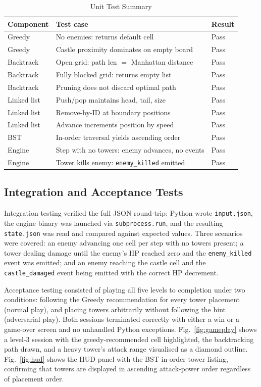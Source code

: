 \documentclass[conference]{IEEEtran}
\begin{document}
\begin{table}[t]
\centering
\caption{Unit Test Summary}
\label{tab:tests}
\begin{tabular}{p{1.4cm} p{3.4cm} p{1.5cm}}
\toprule
\textbf{Component} & \textbf{Test case} & \textbf{Result} \\
\midrule
Greedy    & No enemies: returns default cell             & Pass \\
Greedy    & Castle proximity dominates on empty board    & Pass \\
Backtrack & Open grid: path len $=$ Manhattan distance   & Pass \\
Backtrack & Fully blocked grid: returns empty list       & Pass \\
Backtrack & Pruning does not discard optimal path        & Pass \\
Linked list & Push/pop maintains head, tail, size        & Pass \\
Linked list & Remove-by-ID at boundary positions         & Pass \\
Linked list & Advance increments position by speed       & Pass \\
BST       & In-order traversal yields ascending order    & Pass \\
Engine    & Step with no towers: enemy advances, no events & Pass \\
Engine    & Tower kills enemy: \texttt{enemy\_killed} emitted & Pass \\
\bottomrule
\end{tabular}
\end{table}

\subsection{Integration and Acceptance Tests}
\label{subsec:integration}

Integration testing verified the full JSON round-trip: Python wrote
\texttt{input.json}, the engine binary was launched via \texttt{subprocess.run},
and the resulting \texttt{state.json} was read and compared against expected
values.
Three scenarios were covered: an enemy advancing one cell per step with no
towers present; a tower dealing damage until the enemy's HP reached zero and
the \texttt{enemy\_killed} event was emitted; and an enemy reaching the castle
cell and the \texttt{castle\_damaged} event being emitted with the correct HP
decrement.

Acceptance testing consisted of playing all five levels to completion under two
conditions: following the Greedy recommendation for every tower placement
(normal play), and placing towers arbitrarily without following the hint
(adversarial play).
Both sessions terminated correctly with either a win or a game-over screen and
no unhandled Python exceptions.
Fig.~\ref{fig:gameplay} shows a level-3 session with the greedy-recommended cell
highlighted, the backtracking path drawn, and a heavy tower's attack range
visualised as a diamond outline.
Fig.~\ref{fig:hud} shows the HUD panel with the BST in-order tower listing,
confirming that towers are displayed in ascending attack-power order regardless
of placement order.
\end{document}
